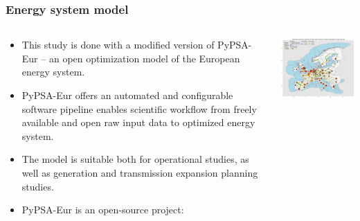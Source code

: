 \begin{frame}
  \label{methodology} %
  \frametitle{Energy system model}

  \begin{columns}[T]
  \begin{column}{7cm}
  {\footnotesize
  \begin{itemize}
  \item This study is done with a modified version of \alert{PyPSA-Eur} -- an open optimization model of the European energy system.
  \item PyPSA-Eur offers an automated and configurable software pipeline enables scientific workflow from freely available and open raw input data to optimized energy system. 
  \item The model is suitable both for operational studies, as well as generation and transmission expansion planning studies. 
  \item  PyPSA-Eur is an open-source project: \\
  \faGithub~ \\
  \faBook~ \\
  \faLink~ 
  \end{itemize}
  }
  \end{column}

  \begin{column}{9cm}
    \centering
    \vspace{0.1cm}
    \includegraphics[width=8cm]{images/elec_s_100.png}
  \end{column}
  \end{columns}

\end{frame}



